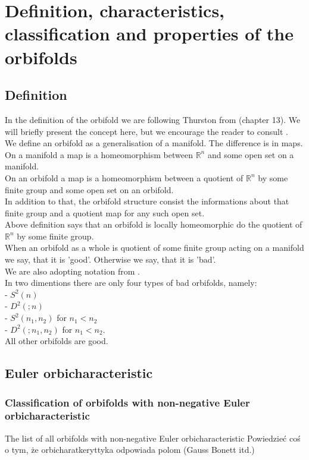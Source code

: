 \chapter{Definition, characteristics, classification and properties of the orbifolds}
\section{Definition}
In the definition of the orbifold we are following Thurston from \cite{Thurston1979} (chapter 13). 
We will briefly present the concept here, but we encourage the reader to consult 
\cite{Thurston1979}. \\
We define an orbifold as a generalisation of a manifold. The difference is in maps. \\
On a manifold a map is a homeomorphism between $\mathbb{R}^n$ and some open set on a manifold. \\
On an orbifold a map is a homeomorphism between a quotient of $\mathbb{R}^n$ by some 
finite group and some open set on an orbifold. \\
In addition to that, the orbifold structure consist the informations about that finite group 
and a quotient map for any such open set. \\

Above definition says that an orbifold is locally homeomorphic do the quotient of $\mathbb{R}^n$ 
by some finite group. \\
When an orbifold as a whole is quotient of some finite group acting on a manifold we say, that 
it is 'good'. Otherwise we say, that it is 'bad'. \\

We are also adopting notation from \cite{Thurston1979}. \\

In two dimentions there are only four types of bad orbifolds, namely: \\
- $S^2(n)$ \\
- $D^2(;n)$ \\
- $S^2(n_1,n_2)$ for $n_1 < n_2$ \\
- $D^2(;n_1,n_2)$ for $n_1 < n_2$. \\
All other orbifolds are good.
\section{Euler orbicharacteristic}
\subsection{Classification of orbifolds with non-negative Euler orbicharacteristic}
The list of all orbifolds with non-negative Euler orbicharacteristic
Powiedzieć coś o tym, że orbicharatkeryttyka odpowiada polom (Gauss Bonett itd.)
